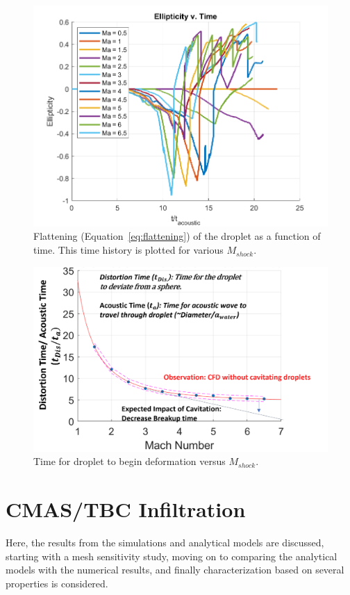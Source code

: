 \documentclass{UCF_ETD}
\begin{document}
\begin{figure}
\centering
\includegraphics[width=\textwidth]{Figures/Ellipticity_v_Ma.png}
\caption{Flattening (Equation~\ref{eq:flattening}) of the droplet as a function of time. This time history is plotted for various $M_{shock}$.}
\label{fig:transientFlattening}
\end{figure}

\begin{figure}
\centering
\includegraphics[width=\textwidth]{Figures/Deformation_time_scale_v_Ma.png}
\caption{Time for droplet to begin deformation versus $M_{shock}$.}
\label{fig:def_time_scale}
\end{figure}




\section{CMAS/TBC Infiltration}
\label{sec:CMAS_results}
Here, the results from the simulations and analytical models are discussed, starting with a mesh sensitivity study, moving on to comparing the analytical models with the numerical results, and finally characterization based on several properties is considered.
\end{document}
